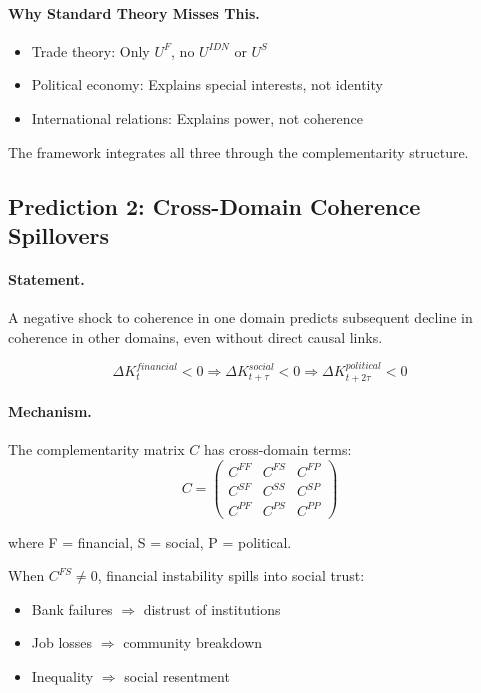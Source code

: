 \paragraph{Why Standard Theory Misses This.}
\begin{itemize}
  \item Trade theory: Only $U^F$, no $U^{IDN}$ or $U^S$
  \item Political economy: Explains special interests, not identity
  \item International relations: Explains power, not coherence
\end{itemize}

The framework integrates all three through the complementarity structure.

\subsection{Prediction 2: Cross-Domain Coherence Spillovers}

\paragraph{Statement.}
A negative shock to coherence in one domain predicts subsequent
decline in coherence in other domains, even without direct causal links.

\begin{equation}
  \Delta K^{financial}_t < 0 \Rightarrow \Delta K^{social}_{t+\tau} < 0 
  \Rightarrow \Delta K^{political}_{t+2\tau} < 0
\end{equation}

\paragraph{Mechanism.}
The complementarity matrix $C$ has cross-domain terms:
\begin{equation}
  C = \begin{pmatrix}
    C^{FF} & C^{FS} & C^{FP} \\
    C^{SF} & C^{SS} & C^{SP} \\
    C^{PF} & C^{PS} & C^{PP}
  \end{pmatrix}
\end{equation}

where F = financial, S = social, P = political.

When $C^{FS} \neq 0$, financial instability spills into social trust:
\begin{itemize}
  \item Bank failures $\Rightarrow$ distrust of institutions
  \item Job losses $\Rightarrow$ community breakdown
  \item Inequality $\Rightarrow$ social resentment
\end{itemize}

